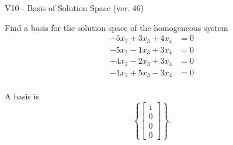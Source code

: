 \begin{exercise}
  \begin{exerciseTitle}V10 - Basis of Solution Space (ver. 46)\end{exerciseTitle}
  \begin{exerciseStatement}
    Find a basis for the solution space of the homogeneous system 
\begin{align*}
 -5 x_ 2 + 3 x_ 3 + 4 x_ 4 &= 0  \\ 
  -5 x_ 2 -1 x_ 3 + 3 x_ 4 &= 0  \\ 
  + 4 x_ 2 -2 x_ 3 + 3 x_ 4 &= 0  \\ 
  -1 x_ 2 + 5 x_ 3 -3 x_ 4 &= 0  \\ 
 \end{align*}


 
  \end{exerciseStatement}

  \begin{exerciseAnswer}
   A basis is   
\[\left\{\left[\begin{array}{c}
1 \\
0 \\
0 \\
0
\end{array}\right]\right\}.\]

  


  \end{exerciseAnswer}
\end{exercise}